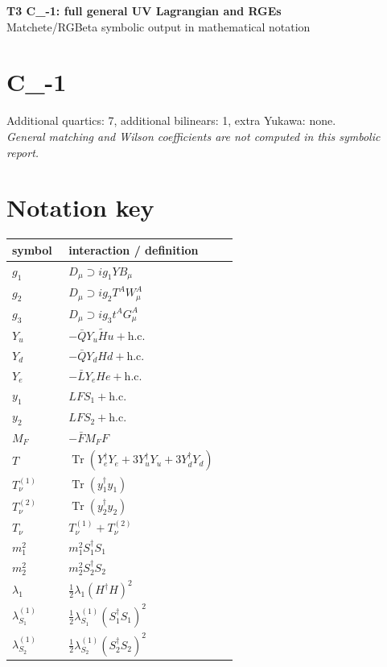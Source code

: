 \documentclass[10pt,a4paper]{article}
\begin{document}
\begin{center}
{\Large\bfseries T3 C\_-1: full general UV Lagrangian and RGEs}\\[4pt]
Matchete/RGBeta symbolic output in mathematical notation
\end{center}
\bigskip
\section*{C\_-1}
Additional quartics: 7, additional bilinears: 1, extra Yukawa: none.\\
\emph{General matching and Wilson coefficients are not computed in this symbolic report.}
\section*{Notation key}
\begin{longtable}{@{}p{0.23\linewidth}p{0.69\linewidth}@{}}
\toprule
symbol & interaction / definition \\
\midrule
$g_1$ & $D_\mu\supset i g_1YB_\mu$ \\
$g_2$ & $D_\mu\supset i g_2T^AW_\mu^A$ \\
$g_3$ & $D_\mu\supset i g_3t^AG_\mu^A$ \\
$Y_u$ & $-\bar QY_u\widetilde Hu+\mathrm{h.c.}$ \\
$Y_d$ & $-\bar QY_dHd+\mathrm{h.c.}$ \\
$Y_e$ & $-\bar LY_eHe+\mathrm{h.c.}$ \\
$y_1$ & $LFS_1+\mathrm{h.c.}$ \\
$y_2$ & $LFS_2+\mathrm{h.c.}$ \\
$M_F$ & $-\bar FM_FF$ \\
$T$ & $\operatorname{Tr}(Y_e^\dagger Y_e+3Y_u^\dagger Y_u+3Y_d^\dagger Y_d)$ \\
$T_\nu^{(1)}$ & $\operatorname{Tr}(y_1^\dagger y_1)$ \\
$T_\nu^{(2)}$ & $\operatorname{Tr}(y_2^\dagger y_2)$ \\
$T_\nu$ & $T_\nu^{(1)}+T_\nu^{(2)}$ \\
$m_1^2$ & $m_1^2S_1^\dagger S_1$ \\
$m_2^2$ & $m_2^2S_2^\dagger S_2$ \\
$\lambda_1$ & $\frac12\lambda_1(H^\dagger H)^2$ \\
$\lambda_{S_1}^{(1)}$ & $\frac12\lambda_{S_1}^{(1)}(S_1^\dagger S_1)^2$ \\
$\lambda_{S_2}^{(1)}$ & $\frac12\lambda_{S_2}^{(1)}(S_2^\dagger S_2)^2$ \\

\end{longtable}
\end{document}
